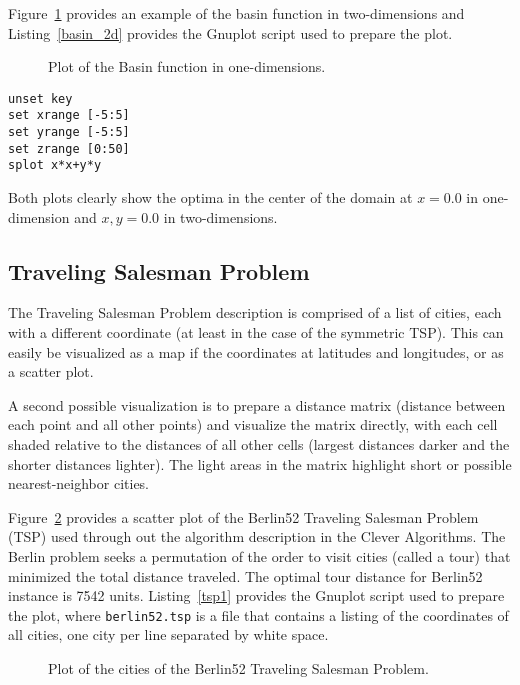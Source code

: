 \documentclass[a4paper, 11pt]{article}
\begin{document}
Figure~\ref{plot:basin2} provides an example of the basin function in two-dimensions and Listing~\ref{basin_2d} provides the Gnuplot script used to prepare the plot.

\begin{figure}[htp]

\caption{Plot of the Basin function in one-dimensions.}
\label{plot:basin2}
\end{figure}

\begin{lstlisting}[caption=Gnuplot script for plotting the Basin function in two-dimensions, label=basin_2d]
unset key
set xrange [-5:5]
set yrange [-5:5]
set zrange [0:50]
splot x*x+y*y
\end{lstlisting}

Both plots clearly show the optima in the center of the domain at $x=0.0$ in one-dimension and $x,y=0.0$ in two-dimensions.

\subsection{Traveling Salesman Problem}
The Traveling Salesman Problem description is comprised of a list of cities, each with a different coordinate (at least in the case of the symmetric TSP). This can easily be visualized as a map if the coordinates at latitudes and longitudes, or as a scatter plot.

A second possible visualization is to prepare a distance matrix (distance between each point and all other points) and visualize the matrix directly, with each cell shaded relative to the distances of all other cells (largest distances darker and the shorter distances lighter). The light areas in the matrix highlight short or possible nearest-neighbor cities.

Figure~\ref{plot:tsp1} provides a scatter plot of the Berlin52 Traveling Salesman Problem (TSP) used through out the algorithm description in the Clever Algorithms. The Berlin problem seeks a permutation of the order to visit cities (called a tour) that minimized the total distance traveled. The optimal tour distance for Berlin52 instance is 7542 units. Listing~\ref{tsp1} provides the Gnuplot script used to prepare the plot, where \texttt{berlin52.tsp} is a file that contains a listing of the coordinates of all cities, one city per line separated by white space.

\begin{figure}[htp]

\caption{Plot of the cities of the Berlin52 Traveling Salesman Problem.}
\label{plot:tsp1}
\end{figure}
\end{document}
